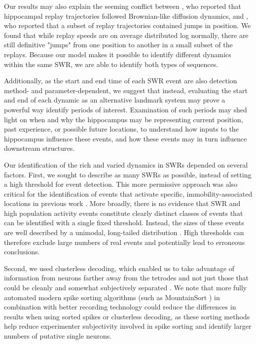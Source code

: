 \documentclass[9pt,lineno]{elife}
\begin{document}
Our results may also explain the seeming conflict between \cite{StellaHippocampalReactivationRandom2019}, who reported that hippocampal replay trajectories followed Brownian-like diffusion dynamics, and \cite{PfeifferAutoassociativedynamicsgeneration2015}, who reported that a subset of replay trajectories contained jumps in position. We found that while replay speeds are on average distributed log normally, there are still definitive "jumps" from one position to another in a small subset of the replays. Because our model makes it possible to identify different dynamics within the same SWR, we are able to identify both types of sequences.

Additionally, as the start and end time of each SWR event are also detection method- and parameter-dependent, we suggest that instead, evaluating the start and end of each dynamic as an alternative landmark system may prove a powerful way identify periods of interest. Examination of such periods may shed light on when and why the hippocampus may be representing current position, past experience, or possible future locations, to understand how inputs to the hippocampus influence these events, and how these events may in turn influence downstream structures.

Our identification of the rich and varied dynamics in SWRs depended on several factors. First, we sought to describe as many SWRs as possible, instead of setting a high threshold for event detection. This more permissive approach was also critical for the identification of events that activate specific, immobility-associated locations in previous work \citep{YuDistincthippocampalcorticalmemory2017}. More broadly, there is no evidence that SWR and high population activity events constitute clearly distinct classes of events that can be identified with a single fixed threshold. Instead, the sizes of these events are well described by a unimodal, long-tailed distribution \citep{ChengNewExperiencesEnhance2008}. High thresholds can therefore exclude large numbers of real events and potentially lead to erroneous conclusions.

Second, we used clusterless decoding, which enabled us to take advantage of information from neurons farther away from the tetrodes and not just those that could be cleanly and somewhat subjectively separated \citep{ChenTransductiveneuraldecoding2012, KloostermanBayesiandecodingusing2014, DengRapidclassificationhippocampal2016}. We note that more fully automated modern spike sorting algorithms (such as MountainSort \citep{ChungFullyAutomatedApproach2017}) in combination with better recording technology could reduce the differences in results when using sorted spikes or clusterless decoding, as these sorting methods help reduce  experimenter subjectivity involved in spike sorting and identify larger numbers of putative single neurons.  
\end{document}
